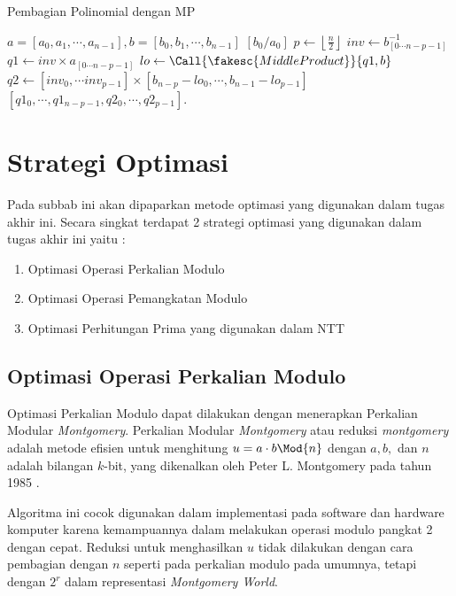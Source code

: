 \begin{algorithm}
	\caption{Pembagian Polinomial dengan MP}
	\label{psdo:pembagian_poli_mp}
	\begin{algorithmic}[1]
		\Require $a = [a_0, a_1, \cdots, a_{n-1}], b = [b_0, b_1, \cdots, b_{n-1}]$
		\State \Return $ \left [b_0/a_0\right ] $ 
		\EndIf
		\State $ p \leftarrow \left \lfloor \frac{n}{2} \right \rfloor $
		\State $ inv \leftarrow b_{[0 \cdots n - p - 1]}^{-1} $
		\State $ q1 \leftarrow inv \times a_{[0 \cdots n - p - 1]} $
		\State $ lo \leftarrow \Call{\fakesc{MiddleProduct}}{q1, b} $
		\State $ q2 \leftarrow \left[ inv_0, \cdots inv_{p-1} \right] \times \left[ b_{n-p} - lo_{0}, \cdots,  b_{n-1} - lo_{p-1} \right] $
		\State \Return $ [q1_0, \cdots, q1_{n-p-1}, q2_0, \cdots, q2_{p-1}] $.
	\end{algorithmic}
\end{algorithm}

\section{ Strategi Optimasi}
Pada subbab ini akan dipaparkan metode optimasi yang digunakan dalam tugas akhir ini. Secara singkat terdapat 2 strategi optimasi yang digunakan dalam tugas akhir ini yaitu :
\begin{enumerate}
	\item Optimasi Operasi Perkalian Modulo
	\item Optimasi Operasi Pemangkatan Modulo
	\item Optimasi Perhitungan Prima yang digunakan dalam NTT
\end{enumerate}

\subsection{ Optimasi Operasi Perkalian Modulo}
Optimasi Perkalian Modulo dapat dilakukan dengan menerapkan Perkalian Modular \textit{Montgomery}. Perkalian Modular \textit{Montgomery} atau reduksi \textit{montgomery} adalah metode efisien untuk menghitung $ u = a \cdot b \Mod{n} $ dengan $ a, b, $ dan $ n $ adalah  bilangan $k$-bit, yang dikenalkan oleh Peter L. Montgomery pada tahun 1985 \cite{montgomery}. 

Algoritma ini cocok digunakan dalam implementasi pada software dan hardware komputer karena kemampuannya dalam melakukan operasi modulo pangkat 2 dengan cepat. Reduksi untuk menghasilkan $ u $ tidak dilakukan dengan cara pembagian dengan $ n $ seperti pada perkalian modulo pada umumnya, tetapi dengan $ 2^r $ dalam representasi \textit{Montgomery World}.

